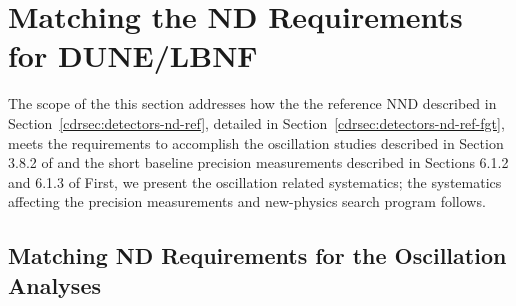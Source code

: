 
\section{Matching the ND Requirements for DUNE/LBNF} 
\label{cdrsec:detectors-nd-ref-fgt-req}

The scope of the this section addresses how the the reference NND
described in Section~\ref{cdrsec:detectors-nd-ref}, detailed in
Section~\ref{cdrsec:detectors-nd-ref-fgt},  meets the
requirements to accomplish the oscillation studies described in
Section 3.8.2 of \volphys %
and the short baseline precision measurements described in Sections 6.1.2
and 6.1.3 of \volphys %
First,
we present the oscillation related systematics; the systematics
affecting the precision measurements and new-physics search program
follows.


\subsection{Matching ND Requirements for the Oscillation Analyses} 
\label{cdrsec:detectors-nd-ref-fgt-req-oscl}

